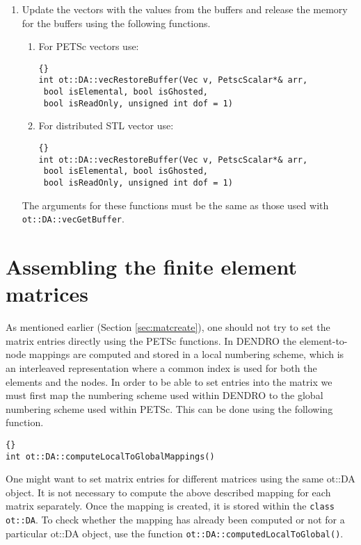 \documentclass[12pt,reqno,a4paper]{report}
\numberwithin{equation}{section}
\begin{document}
\begin{enumerate}
\item Update the vectors with the values from the buffers and release the memory for the buffers using the following functions.

\begin{enumerate}

\item For PETSc vectors use:

\begin{lstlisting}[frame=trbl, fontadjust]{}
int ot::DA::vecRestoreBuffer(Vec v, PetscScalar*& arr, 
 bool isElemental, bool isGhosted,
 bool isReadOnly, unsigned int dof = 1)
\end{lstlisting}

\item For distributed STL vector use:

\begin{lstlisting}[frame=trbl, fontadjust]{}
int ot::DA::vecRestoreBuffer(Vec v, PetscScalar*& arr,
 bool isElemental, bool isGhosted,
 bool isReadOnly, unsigned int dof = 1)
\end{lstlisting}

\end{enumerate}

The arguments for these functions must be the same as those used with \lstinline[basicstyle=\bfseries]!ot::DA::vecGetBuffer!.

\end{enumerate}

\section{Assembling the finite element matrices}
\label{sec:matassemble}
As mentioned earlier (Section \ref{sec:matcreate}), one should not try to set the matrix entries directly using the PETSc functions. In DENDRO the element-to-node mappings are computed and stored in a local numbering scheme, which is an interleaved representation where a common index is used for both the elements and the nodes. In order to be able to set entries into the matrix we must first map the numbering scheme used within DENDRO to the global numbering scheme used within PETSc. This can be done using the following function.

\begin{lstlisting}[frame=trbl, fontadjust]{}
int ot::DA::computeLocalToGlobalMappings()
\end{lstlisting}

One might want to set matrix entries for different matrices using the same ot::DA object. It is not necessary to compute the above described mapping for each matrix separately. Once the mapping is created, it is stored within the \lstinline[basicstyle=\bfseries]!class ot::DA!. To check whether the mapping has already been computed or not for a particular ot::DA object, use the function \lstinline[basicstyle=\bfseries]!ot::DA::computedLocalToGlobal()!.
\end{document}
